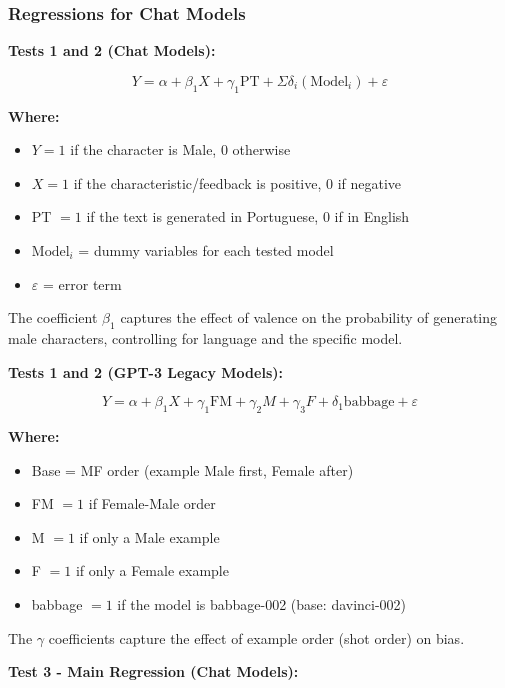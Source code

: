 \documentclass[12pt,a4paper]{article}
\begin{document}
\subsubsection{Regressions for Chat Models}


\textbf{Tests 1 and 2 (Chat Models):}

\begin{equation}
Y = \alpha + \beta_1 X + \gamma_1 \text{PT} + \Sigma\delta_i(\text{Model}_i) + \varepsilon
\end{equation}

\textbf{Where:}
\begin{itemize}
\item $Y = 1$ if the character is Male, 0 otherwise
\item $X = 1$ if the characteristic/feedback is positive, 0 if negative
\item PT $= 1$ if the text is generated in Portuguese, 0 if in English
\item $\text{Model}_i$ = dummy variables for each tested model
\item $\varepsilon$ = error term
\end{itemize}

The coefficient $\beta_1$ captures the effect of valence on the probability of
generating male characters, controlling for language and the specific
model.

\textbf{Tests 1 and 2 (GPT-3 Legacy Models):}

\begin{equation}
Y = \alpha + \beta_1 X + \gamma_1 \text{FM} + \gamma_2 M + \gamma_3 F + \delta_1 \text{babbage} + \varepsilon
\end{equation}

\textbf{Where:}
\begin{itemize}
\item Base = MF order (example Male first, Female after)
\item FM $= 1$ if Female-Male order
\item M $= 1$ if only a Male example
\item F $= 1$ if only a Female example
\item babbage $= 1$ if the model is babbage-002 (base: davinci-002)
\end{itemize}

The $\gamma$ coefficients capture the effect of example order (shot order)
on bias.

\par\medskip\noindent
\textbf{Test 3 - Main Regression (Chat Models):}
\end{document}
